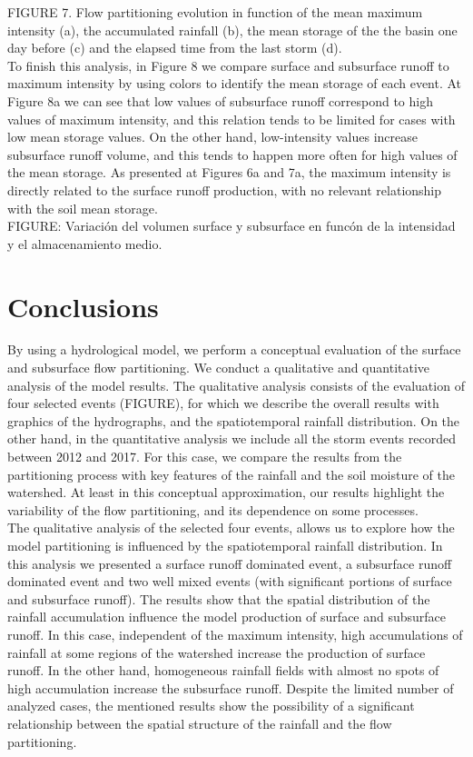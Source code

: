 \documentclass[preprint,12pt]{elsarticle}
\begin{document}
FIGURE 7. Flow partitioning evolution in function of the mean maximum intensity (a), the accumulated rainfall (b), the mean storage of the the basin one day before (c) and the elapsed time from the last storm (d).\\

To finish this analysis, in Figure 8 we compare surface and subsurface runoff to maximum intensity by using colors to identify the mean storage of each event.  At Figure 8a we can see that low values of subsurface runoff correspond to high values of maximum intensity, and this relation tends to be limited for cases with low mean storage values.  On the other hand, low-intensity values increase subsurface runoff volume, and this tends to happen more often for high values of the mean storage.  As presented at Figures 6a and 7a, the maximum intensity is directly related to the surface runoff production, with no relevant relationship with the soil mean storage.\\

FIGURE: Variación del volumen surface y subsurface en funcón de la intensidad y el almacenamiento medio.\\

\section{Conclusions}

By using a hydrological model, we perform a conceptual evaluation of the surface and subsurface flow partitioning. We conduct a qualitative and quantitative analysis of the model results.  The qualitative analysis consists of the evaluation of four selected events (FIGURE), for which we describe the overall results with graphics of the hydrographs, and the spatiotemporal rainfall distribution.  On the other hand, in the quantitative analysis we include all the storm events recorded between 2012 and 2017.  For this case, we compare the results from the partitioning process with key features of the rainfall and the soil moisture of the watershed.  At least in this conceptual approximation, our results highlight the variability of the flow partitioning, and its dependence on some processes.\\

The qualitative analysis of the selected four events, allows us to explore how the model partitioning is influenced by the spatiotemporal rainfall distribution.  In this analysis we presented a surface runoff dominated event, a subsurface runoff dominated event and two well mixed events (with significant portions of surface and subsurface runoff).  The results show that the spatial distribution of the rainfall accumulation influence the model production of surface and subsurface runoff. In this case, independent of the maximum intensity, high accumulations of rainfall at some regions of the watershed increase the production of surface runoff.  In the other hand, homogeneous rainfall fields with almost no spots of high accumulation increase the subsurface runoff.  Despite the limited number of analyzed cases, the mentioned results show the possibility of a significant relationship between the spatial structure of the rainfall and the flow partitioning.\\
\end{document}
